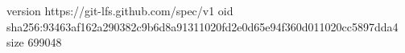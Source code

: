 version https://git-lfs.github.com/spec/v1
oid sha256:93463af162a290382c9b6d8a91311020fd2e0d65e94f360d011020cc5897dda4
size 699048
